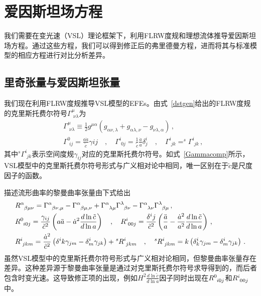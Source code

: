 \documentclass[jkps,preprint,fleqn]{revtex4}
\newcommand{\tc}{\tilde{c}}
\begin{document}
\section{爱因斯坦场方程} \label{sec:EFEs}

我们需要在变光速（VSL）理论框架下，利用FLRW度规和理想流体推导爱因斯坦场方程。通过这些方程，我们可以得到修正后的弗里德曼方程，进而将其与标准模型的相应方程进行对比分析差异。
\subsection{里奇张量与爱因斯坦张量}\label{subsec:RS}
我们现在利用FLRW度规推导VSL模型的EFEs\cite{Lee:2020zts,Lee:2025rpw}。由式~\eqref{dstgen}给出的FLRW度规的克里斯托费尔符号$\Gamma^{\mu}_{\,\,\nu\lambda}$为
\begin{align}
&\Gamma^{\mu}_{\,\,\nu\lambda} \equiv \frac{1}{2} g^{\mu\alpha} \left( g_{\alpha\nu,\lambda} + g_{\alpha\lambda,\nu} - g_{\nu\lambda,\alpha} \right) \label{Gamma}\,, \\ &\Gamma^{0}_{\,\,ij} = \frac{a\dot{a}}{\tc} \gamma{ij} \quad , \quad \Gamma^{i}_{\,\,0j} = \frac{1}{\tc}  \frac{\dot{a}}{a} \delta^i_j \quad , \quad \Gamma^{i}_{\,\,jk} = ^{s}\Gamma^{i}_{\,\,jk}  \label{Gammacomp} \,, \end{align}
其中$^{s}\Gamma^{i}_{\,\,jk}$表示空间度规$\gamma_{ij}$对应的克里斯托费尔符号。如式~\eqref{Gammacomp}所示，VSL模型中的克里斯托费尔符号形式与广义相对论中相同，唯一区别在于$\tc$是尺度因子的函数。

描述流形曲率的黎曼曲率张量由下式给出
\begin{align}
&\tensor{R}{^\alpha_\beta_\mu_\nu} = \tensor{\Gamma}{^\alpha_\beta_\nu_,_\mu} - \tensor{\Gamma}{^\alpha_\beta_\mu_,_\nu} + \tensor{\Gamma}{^\alpha_\lambda_\mu} \tensor{\Gamma}{^\lambda_\beta_\nu} - \tensor{\Gamma}{^\alpha_\lambda_\nu} \tensor{\Gamma}{^\lambda_\beta_\mu} \label{Rabmu} \,, \\ &\tensor{R}{^0_i_0_j} = \frac{\gamma_{ij}}{\tc^2} \left( a \ddot{a} - \dot{a}^2 \frac{d \ln \tc}{d \ln a} \right) \quad , \quad \tensor{R}{^i_0_0_j} = \frac{\delta^{i}{j}}{\tc^2} \left( \frac{\ddot{a}}{a} - \frac{\dot{a}^2}{a^2} \frac{d \ln \tc}{ d \ln a}  \right) \,, \label{R0i0j} \\ &\tensor{R}{^i_j_k_m} = \frac{\dot{a}^2}{\tc^2} \left( \delta^{i}{k} \gamma_{jm} - \delta^i_m \gamma_{jk} \right) + \tensor[^s]{R}{^i_j_k_m} \quad , \quad \tensor[^s]{R}{^i_j_k_m} = k \left( \delta^i_k \gamma_{jm} - \delta^i_m \gamma_{jk} \right) \,. \label{Rijkm} \end{align}
虽然VSL模型中的克里斯托费尔符号形式与广义相对论相同，但黎曼曲率张量存在差异。这种差异源于黎曼曲率张量是通过对克里斯托费尔符号求导得到的，而后者包含时变光速。这导致修正项的出现，例如$H^2 \frac{d \ln \tc}{d \ln a}$因子同时出现在$\tensor{R}{^0_i_0_j}$和$\tensor{R}{^i_0_0_j}$中。
\end{document}
